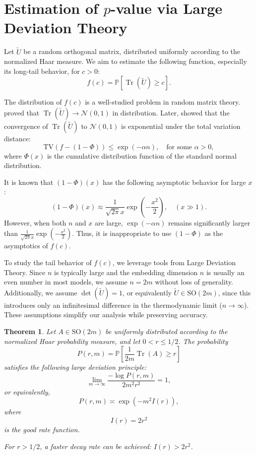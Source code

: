 \documentclass{article} %
\DeclareMathOperator{\Tr}{Tr}
\newtheorem{thm}{Theorem}
\begin{document}
\section{Estimation of $p$-value via Large Deviation Theory}
\label{appendix_estimate_p}
Let $\tilde{U}$ be a random orthogonal matrix, distributed uniformly according to the normalized Haar measure. 
We aim to estimate the following function, especially its long-tail behavior, for $c > 0$:
\[
f(c) = \mathbb{P}\left[\Tr(\tilde{U}) \geq c\right].
\]

The distribution of $f(c)$ is a well-studied problem in random matrix theory.  
\citet{DiaconisShahshahani1994} proved that $\Tr(\tilde{U}) \to \mathcal{N}(0, 1)$ in distribution.  
Later, \citet{Johansson1997} showed that the convergence of $\Tr(\tilde{U})$ to $\mathcal{N}(0, 1)$ is exponential under the total variation distance:
\[
\mathrm{TV}(f - (1 - \Phi)) \leq \exp(-\alpha n), \quad \text{for some } \alpha > 0,
\]
where $\Phi(x)$ is the cumulative distribution function of the standard normal distribution.

It is known that $(1 - \Phi)(x)$ has the following asymptotic behavior for large $x$:
\[
(1 - \Phi)(x) \approx \frac{1}{\sqrt{2\pi} x} \exp\left(-\frac{x^2}{2}\right), \quad (x \gg 1).
\]
However, when both $n$ and $x$ are large, $\exp(-\alpha n)$ remains significantly larger than $\frac{1}{\sqrt{2\pi} x} \exp\left(-\frac{x^2}{2}\right)$.  
Thus, it is inappropriate to use $(1 - \Phi)$ as the asymptotics of $f(c)$.

To study the tail behavior of $f(c)$, we leverage tools from Large Deviation Theory.  
Since $n$ is typically large and the embedding dimension $n$ is usually an even number in most models,  
we assume $n = 2m$ without loss of generality.  
Additionally, we assume $\det(\tilde{U}) = 1$, or equivalently $\tilde{U} \in \mathrm{SO}(2m)$,  
since this introduces only an infinitesimal difference in the thermodynamic limit ($n \to \infty$).  
These assumptions simplify our analysis while preserving accuracy.

\begin{thm}
    Let $A \in \mathrm{SO}(2m)$ be uniformly distributed according to the normalized Haar probability measure, and let $0 < r \leq 1/2$.  
    The probability 
    \[
    P(r, m) = \mathbb{P} \left[\frac{1}{2m} \Tr(A) \geq r \right]
    \]
    satisfies the following large deviation principle:
    \[
    \lim_{m \to \infty} \frac{-\log P(r, m)}{2 m^2 r^2} = 1,
    \]
    or equivalently,
    \[
    P(r, m) \asymp \exp(-m^2 I(r)),
    \]
    where 
    \[
    I(r) = 2 r^2
    \]
    is the good rate function.

    For $r > 1/2$, a faster decay rate can be achieved: $I(r) > 2 r^2$.
    \label{thm:ldp}
\end{thm}
\end{document}
